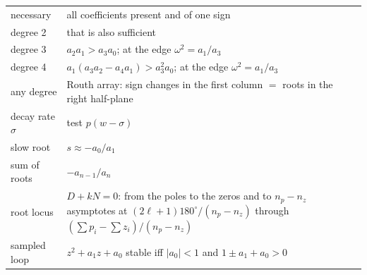 \begin{result}
\begin{center}\small
\renewcommand{\arraystretch}{1.4}
\begin{tabularx}{\linewidth}{@{}l>{\raggedright\arraybackslash}X@{}}
necessary & all coefficients present and of one sign\\
degree 2 & that is also sufficient\\
degree 3 & $a_2a_1 > a_3a_0$; at the edge $\omega^2 = a_1/a_3$\\
degree 4 & $a_1(a_3a_2 - a_4a_1) > a_3^2a_0$; at the edge $\omega^2 = a_1/a_3$\\
any degree & Routh array: sign changes in the first column $=$ roots in the right half-plane\\
decay rate $\sigma$ & test $p(w - \sigma)$\\
slow root & $s \approx -a_0/a_1$\\
sum of roots & $-a_{n-1}/a_n$\\
root locus & $D + kN = 0$: from the poles to the zeros and to $n_p - n_z$ asymptotes at $(2\ell + 1)180^\circ/(n_p - n_z)$ through $(\sum p_i - \sum z_i)/(n_p - n_z)$\\
sampled loop & $z^2 + a_1z + a_0$ stable iff $|a_0| < 1$ and $1 \pm a_1 + a_0 > 0$\\
\end{tabularx}
\end{center}
\end{result}
